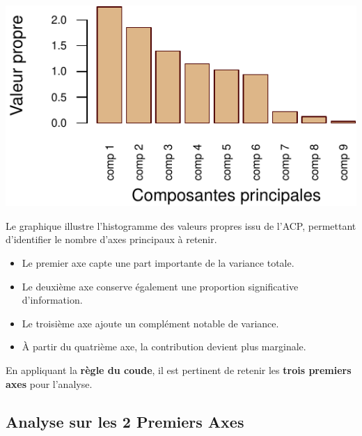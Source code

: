 \documentclass[
  12pt,
]{article}
\providecommand{\tightlist}{%
  \setlength{\itemsep}{0pt}\setlength{\parskip}{0pt}}
\begin{document}
\begin{center}\includegraphics{rmd_final_files/figure-latex/unnamed-chunk-30-1} \end{center}

Le graphique illustre l'histogramme des valeurs propres issu de l'ACP,
permettant d'identifier le nombre d'axes principaux à retenir.

\begin{itemize}
\tightlist
\item
  Le premier axe capte une part importante de la variance totale.
\item
  Le deuxième axe conserve également une proportion significative
  d'information.
\item
  Le troisième axe ajoute un complément notable de variance.
\item
  À partir du quatrième axe, la contribution devient plus marginale.
\end{itemize}

En appliquant la \textbf{règle du coude}, il est pertinent de retenir
les \textbf{trois premiers axes} pour l'analyse.

\subsection{Analyse sur les 2 Premiers
Axes}\label{analyse-sur-les-2-premiers-axes}
\end{document}
